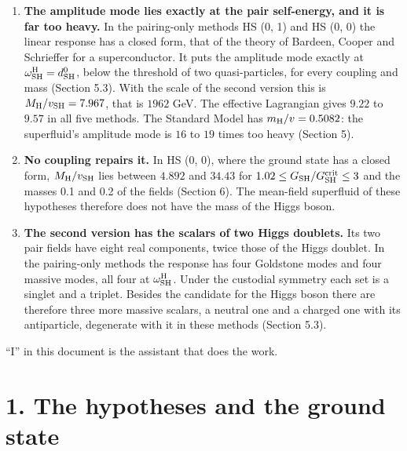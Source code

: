 \documentclass[
  10pt,
]{article}
\begin{document}
\begin{enumerate}
  \textbf{The scale.} \(v_{\rm SH}=2(\chi^{11}_{\rm SH})^{1/2}\) is
  \(0.102\) to \(0.1116\) in units of the cutoff in the second version.
  With \(v_{\rm SH}=246.22\) GeV the cutoff \(\Lambda_{\rm LL}\) is
  \(2207\) to \(2413\) GeV, and the lightest fermionic excitations,
  which carry the fractional electric charges \(\tfrac34\) and
  \(-\tfrac14\), have masses of \(848\) to \(1.09\times10^{3}\) GeV
  (Section 4).
\item
  \textbf{The amplitude mode lies exactly at the pair self-energy, and
  it is far too heavy.} In the pairing-only methods HS (0, 1) and HS (0,
  0) the linear response has a closed form, that of the theory of
  Bardeen, Cooper and Schrieffer for a superconductor. It puts the
  amplitude mode exactly at \(\omega^{\rm H}_{\rm SH}=d^0_{\rm SH}\),
  below the threshold of two quasi-particles, for every coupling and
  mass (Section 5.3). With the scale of the second version this is
  \(M_{\rm H}/v_{\rm SH}=7.967\), that is \(1962\) GeV. The effective
  Lagrangian gives \(9.22\) to \(9.57\) in all five methods. The
  Standard Model has \(m_{\rm H}/v=0.5082\): the superfluid's amplitude
  mode is \(16\) to \(19\) times too heavy (Section 5).
\item
  \textbf{No coupling repairs it.} In HS (0, 0), where the ground state
  has a closed form, \(M_{\rm H}/v_{\rm SH}\) lies between \(4.892\) and
  \(34.43\) for \(1.02\le G_{\rm SH}/G^{\rm crit}_{\rm SH}\le3\) and the
  masses 0.1 and 0.2 of the fields (Section 6). The mean-field
  superfluid of these hypotheses therefore does not have the mass of the
  Higgs boson.
\item
  \textbf{The second version has the scalars of two Higgs doublets.} Its
  two pair fields have eight real components, twice those of the Higgs
  doublet. In the pairing-only methods the response has four Goldstone
  modes and four massive modes, all four at \(\omega^{\rm H}_{\rm SH}\).
  Under the custodial symmetry each set is a singlet and a triplet.
  Besides the candidate for the Higgs boson there are therefore three
  more massive scalars, a neutral one and a charged one with its
  antiparticle, degenerate with it in these methods (Section 5.3).
\end{enumerate}

``I'' in this document is the assistant that does the work.

\hypertarget{the-hypotheses-and-the-ground-state}{%
\section{1. The hypotheses and the ground
state}\label{the-hypotheses-and-the-ground-state}}
\end{document}
